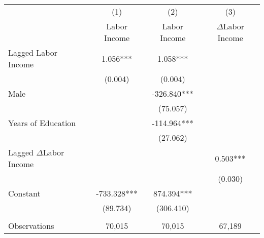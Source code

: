 \begin{tabular}{lccc} \toprule
 & (1) & (2) & (3) \\
&  Labor Income  &  Labor Income  & $\Delta$Labor Income  \\ \midrule
Lagged Labor Income & 1.056*** & 1.058*** &  \\
 & (0.004) & (0.004) &  \\
Male  &  & -326.840*** &  \\
 &  & (75.057) &  \\
Years of Education &  & -114.964*** &  \\
 &  & (27.062) &  \\
Lagged $\Delta$Labor Income &  &  & 0.503*** \\
 &  &  & (0.030) \\
Constant & -733.328*** & 874.394*** &  \\
 & (89.734) & (306.410) &  \\ \\ \midrule
 Observations & 70,015 & 70,015 & 67,189 \\ \bottomrule 
\end{tabular}

